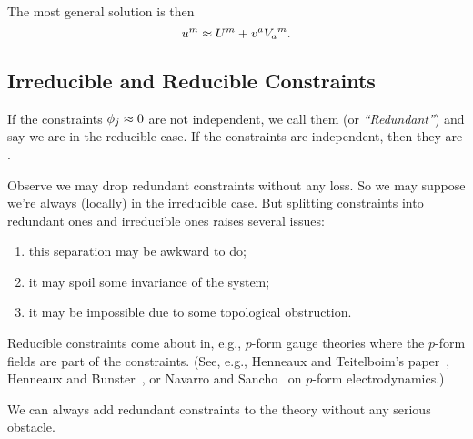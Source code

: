 The most general solution is then
\begin{equation}
u^{m}\approx U^{m} + v^{a}{V_{a}}^{m}.
\end{equation}

\subsection{Irreducible and Reducible Constraints}
\begin{definition}
If the constraints $\phi_{j}\approx0$ are not independent, we call them
 (or \emph{``Redundant''}) and say we are in the
reducible case. If the constraints are independent, then they are
.
\end{definition}

\M
Observe we may drop redundant constraints without any loss. So we may
suppose we're always (locally) in the irreducible case. But splitting
constraints into redundant ones and irreducible ones raises several
issues:
\begin{enumerate}
\item this separation may be awkward to do;
\item it may spoil some invariance of the system;
\item it may be impossible due to some topological obstruction.
\end{enumerate}

\M
Reducible constraints come about in, e.g., $p$-form gauge theories where
the $p$-form fields are part of the constraints. (See, e.g., Henneaux
and Teitelboim's paper~\cite{Henneaux:1986ht}, Henneaux and
Bunster~\cite{Bunster:2011qp}, or Navarro and
Sancho~\cite{Navarro:2012hv} on $p$-form electrodynamics.) 

\M
We can always add redundant constraints to the theory without any
serious obstacle.

